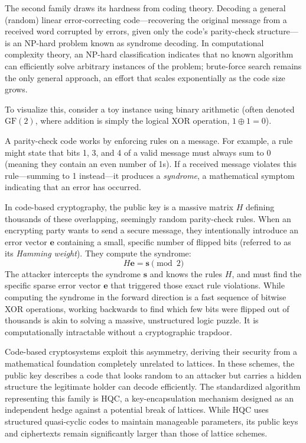 The second family draws its hardness from coding theory. Decoding a general (random) linear error-correcting code---recovering the original message from a received word corrupted by errors, given only the code's parity-check structure---is an NP-hard problem known as syndrome decoding. In computational complexity theory, an NP-hard classification indicates that no known algorithm can efficiently solve arbitrary instances of the problem; brute-force search remains the only general approach, an effort that scales exponentially as the code size grows.

To visualize this, consider a toy instance using binary arithmetic (often denoted $\mathrm{GF}(2)$, where addition is simply the logical XOR operation, $1 \oplus 1 = 0$).

A parity-check code works by enforcing rules on a message. For example, a rule might state that bits 1, 3, and 4 of a valid message must always sum to 0 (meaning they contain an even number of 1s). If a received message violates this rule---summing to 1 instead---it produces a \emph{syndrome}, a mathematical symptom indicating that an error has occurred.

In code-based cryptography, the public key is a massive matrix $H$ defining thousands of these overlapping, seemingly random parity-check rules. When an encrypting party wants to send a secure message, they intentionally introduce an error vector $\mathbf{e}$ containing a small, specific number of flipped bits (referred to as its \emph{Hamming weight}). They compute the syndrome:
\begin{equation}
    H\mathbf{e} = \mathbf{s} \pmod 2
\end{equation}
The attacker intercepts the syndrome $\mathbf{s}$ and knows the rules $H$, and must find the specific sparse error vector $\mathbf{e}$ that triggered those exact rule violations. While computing the syndrome in the forward direction is a fast sequence of bitwise XOR operations, working backwards to find which few bits were flipped out of thousands is akin to solving a massive, unstructured logic puzzle. It is computationally intractable without a cryptographic trapdoor.

Code-based cryptosystems exploit this asymmetry, deriving their security from a mathematical foundation completely unrelated to lattices. In these schemes, the public key describes a code that looks random to an attacker but carries a hidden structure the legitimate holder can decode efficiently. The standardized algorithm representing this family is HQC, a key-encapsulation mechanism designed as an independent hedge against a potential break of lattices. While HQC uses structured quasi-cyclic codes to maintain manageable parameters, its public keys and ciphertexts remain significantly larger than those of lattice schemes.

